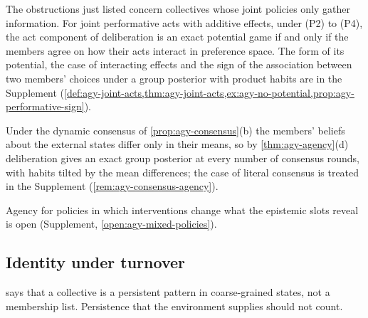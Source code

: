 The obstructions just listed concern collectives whose joint policies only gather information. For joint performative acts with additive effects, under (P2) to (P4), the act component of deliberation is an exact potential game if and only if the members agree on how their acts interact in preference space. The form of its potential, the case of interacting effects and the sign of the association between two members' choices under a group posterior with product habits are in the Supplement (\cref{def:agy-joint-acts,thm:agy-joint-acts,ex:agy-no-potential,prop:agy-performative-sign}).

Under the dynamic consensus of \cref{prop:agy-consensus}(b) the members' beliefs about the external states differ only in their means, so by \cref{thm:agy-agency}(d) deliberation gives an exact group posterior at every number of consensus rounds, with habits tilted by the mean differences; the case of literal consensus is treated in the Supplement (\cref{rem:agy-consensus-agency}).

Agency for policies in which interventions change what the epistemic slots reveal is open (Supplement, \cref{open:agy-mixed-policies}).

\subsection{Identity under turnover}\label{sec:agy-identity}

 says that a collective is a persistent pattern in coarse-grained states, not a membership list. Persistence that the environment supplies should not count.


